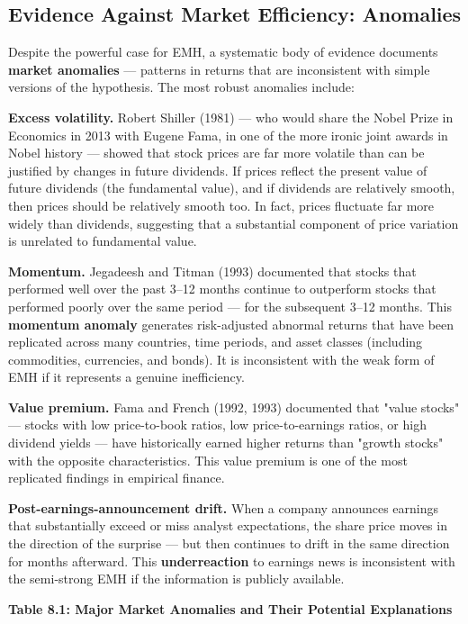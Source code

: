 \documentclass[12pt, letterpaper]{article}
\begin{document}
\subsection{Evidence Against Market Efficiency: Anomalies}


Despite the powerful case for EMH, a systematic body of evidence documents \textbf{market anomalies} --- patterns in returns that are inconsistent with simple versions of the hypothesis. The most robust anomalies include:

\textbf{Excess volatility.} Robert Shiller (1981) --- who would share the Nobel Prize in Economics in 2013 with Eugene Fama, in one of the more ironic joint awards in Nobel history --- showed that stock prices are far more volatile than can be justified by changes in future dividends. If prices reflect the present value of future dividends (the fundamental value), and if dividends are relatively smooth, then prices should be relatively smooth too. In fact, prices fluctuate far more widely than dividends, suggesting that a substantial component of price variation is unrelated to fundamental value.

\textbf{Momentum.} Jegadeesh and Titman (1993) documented that stocks that performed well over the past 3--12 months continue to outperform stocks that performed poorly over the same period --- for the subsequent 3--12 months. This \textbf{momentum anomaly} generates risk-adjusted abnormal returns that have been replicated across many countries, time periods, and asset classes (including commodities, currencies, and bonds). It is inconsistent with the weak form of EMH if it represents a genuine inefficiency.

\textbf{Value premium.} Fama and French (1992, 1993) documented that "value stocks" --- stocks with low price-to-book ratios, low price-to-earnings ratios, or high dividend yields --- have historically earned higher returns than "growth stocks" with the opposite characteristics. This value premium is one of the most replicated findings in empirical finance.

\textbf{Post-earnings-announcement drift.} When a company announces earnings that substantially exceed or miss analyst expectations, the share price moves in the direction of the surprise --- but then continues to drift in the same direction for months afterward. This \textbf{underreaction} to earnings news is inconsistent with the semi-strong EMH if the information is publicly available.

\textbf{Table 8.1: Major Market Anomalies and Their Potential Explanations}
\end{document}
